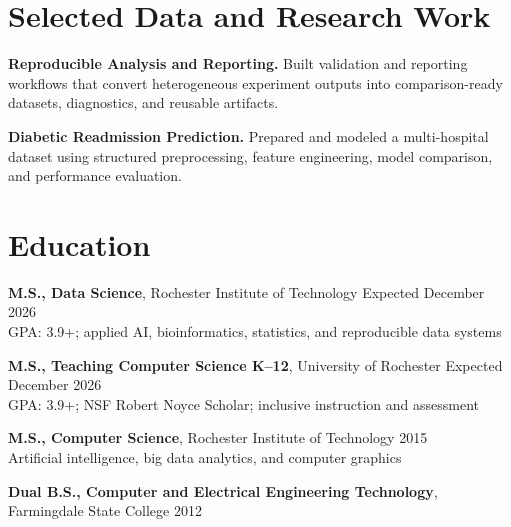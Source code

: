 \documentclass[10pt,letterpaper]{article}
\begin{document}
\section*{Selected Data and Research Work}
\textbf{Reproducible Analysis and Reporting.}
Built validation and reporting workflows that convert heterogeneous experiment
outputs into comparison-ready datasets, diagnostics, and reusable artifacts.

\textbf{Diabetic Readmission Prediction.}
Prepared and modeled a multi-hospital dataset using structured preprocessing,
feature engineering, model comparison, and performance evaluation.

\section*{Education}
\textbf{M.S., Data Science}, Rochester Institute of Technology
\hfill Expected December 2026\\
GPA: 3.9+; applied AI, bioinformatics, statistics, and reproducible data systems

\textbf{M.S., Teaching Computer Science K--12}, University of Rochester
\hfill Expected December 2026\\
GPA: 3.9+; NSF Robert Noyce Scholar; inclusive instruction and assessment

\textbf{M.S., Computer Science}, Rochester Institute of Technology
\hfill 2015\\
Artificial intelligence, big data analytics, and computer graphics

\textbf{Dual B.S., Computer and Electrical Engineering Technology}, Farmingdale State College
\hfill 2012
\end{document}
